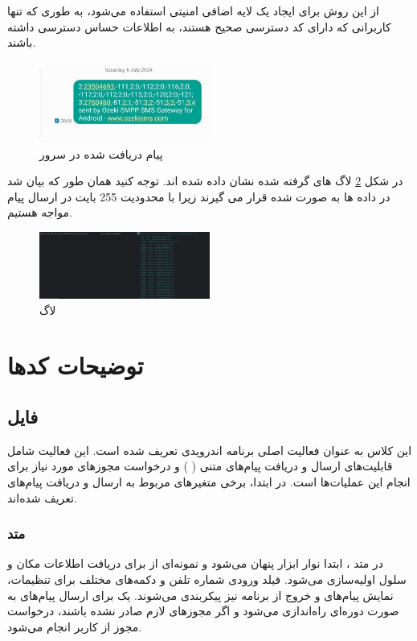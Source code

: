\documentclass{report}
\begin{document}
از این روش برای ایجاد یک لایه اضافی امنیتی استفاده می‌شود، به طوری که تنها کاربرانی که دارای کد دسترسی صحیح هستند، به اطلاعات حساس دسترسی داشته باشند.

\begin{figure}[b]
	\centering
	\includegraphics[width=0.5\textwidth]{Pic/Message}
	\caption{پیام دریافت شده در سرور}
	\label{fig:Server}
\end{figure}

در شکل \ref{fig:log1} لاگ های گرفته شده نشان داده شده اند. توجه کنید همان طور که بیان شد در 
داده ها به صورت 
شده قرار می گیرند زیرا با محدودیت 255 بایت در ارسال پیام مواجه هستیم.
\begin{figure}[b]
	\centering
	\includegraphics[width=0.5\textwidth]{Pic/log1}
	\caption{لاگ}
	\label{fig:log1}
\end{figure}
\chapter{توضیحات کدها}
\section{فایل
}
این کلاس
 به عنوان فعالیت اصلی برنامه اندرویدی تعریف شده است. این فعالیت شامل قابلیت‌های ارسال و دریافت پیام‌های متنی (
 ) و درخواست مجوزهای مورد نیاز برای انجام این عملیات‌ها است. در ابتدا، برخی متغیرهای مربوط به ارسال و دریافت پیام‌های
   تعریف شده‌اند.

\subsection{متد
}
در متد
 ، ابتدا نوار ابزار پنهان می‌شود و نمونه‌ای از
   برای دریافت اطلاعات مکان و سلول اولیه‌سازی می‌شود. فیلد ورودی شماره تلفن و دکمه‌های مختلف برای تنظیمات، نمایش پیام‌های 
    و خروج از برنامه نیز پیکربندی می‌شوند. یک
     برای ارسال پیام‌های 
      به صورت دوره‌ای راه‌اندازی می‌شود و اگر مجوزهای لازم صادر نشده باشند، درخواست مجوز از کاربر انجام می‌شود.
\end{document}
